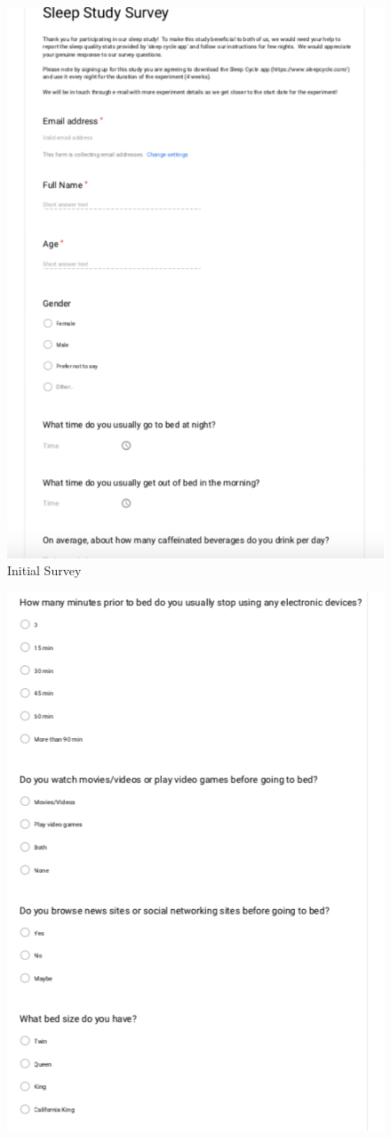 \documentclass[12pt,]{article}
\begin{document}
\begin{figure}[H]

{\centering \includegraphics[width=0.8\linewidth]{img/initial_survey_1} 

}

\caption{Initial Survey}\label{fig:unnamed-chunk-7}
\end{figure}\begin{figure}[H]

{\centering \includegraphics[width=0.8\linewidth]{img/initial_survey_2} 

}
\end{figure}
\end{document}
